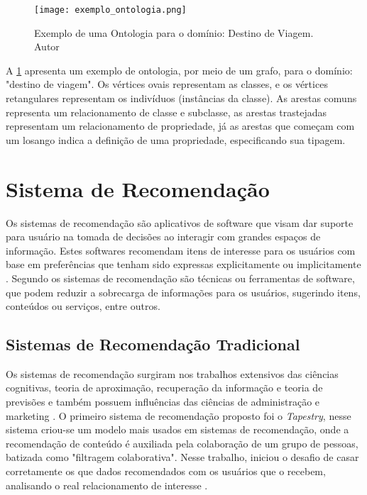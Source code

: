 \begin{figure}[htb]
	\centering					
	{\texttt{[image: exemplo\_ontologia.png]}}
	
	\caption{Exemplo de uma Ontologia para o domínio: Destino de Viagem. Autor}
	\label{fig:exemplo_ont}
\end{figure}

A \ref{fig:exemplo_ont} apresenta um exemplo de ontologia, por meio de um grafo, para o domínio: "destino de viagem". Os vértices ovais representam as classes, e os vértices retangulares representam os indivíduos (instâncias da classe). As arestas comuns representa um relacionamento de classe e subclasse, as arestas trastejadas representam um relacionamento de propriedade, já as arestas que começam com um losango indica a definição de uma propriedade, especificando sua tipagem.


\section{Sistema de Recomendação}
\label{sec:sit_recmendacao}

Os sistemas de recomendação são aplicativos de software que visam dar suporte para usuário na tomada de decisões ao interagir com grandes espaços de informação. Estes softwares recomendam itens de interesse para os usuários com base em preferências que tenham sido expressas explicitamente ou implicitamente \cite{ricci2011introduction}. Segundo \citet{mahmood2009improving} os sistemas de recomendação são técnicas ou ferramentas de software, que podem reduzir a sobrecarga de informações para os usuários, sugerindo itens, conteúdos ou serviços, entre outros.

\subsection{Sistemas de Recomendação Tradicional}

Os sistemas de recomendação surgiram nos trabalhos extensivos das ciências cognitivas, teoria de aproximação, recuperação da informação e teoria de previsões e também possuem influências das ciências de administração e marketing \cite{allen2001econometric, murthi2003role}. O primeiro sistema de recomendação proposto foi o \textit{Tapestry}, nesse sistema criou-se um modelo mais usados em sistemas de recomendação, onde a recomendação de conteúdo é auxiliada pela colaboração de um grupo de pessoas, batizada como "filtragem  colaborativa". Nesse trabalho, iniciou o desafio de casar corretamente os que dados recomendados com os usuários que o recebem, analisando o real relacionamento de interesse \cite{kwong1992dynamic, resnick1997recommender}.

